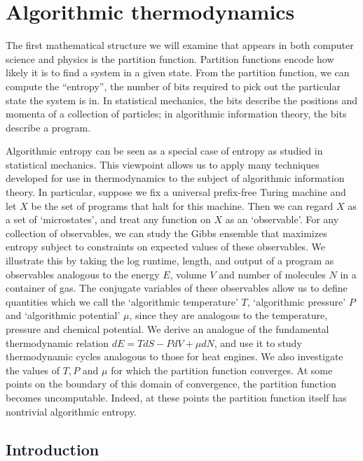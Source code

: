 \documentclass[12pt,twoside,openright]{report}
\begin{document}
\chapter{Algorithmic thermodynamics}

The first mathematical structure we will examine that appears in both computer science and physics is the partition function.  Partition functions encode how likely it is to find a system in a given state.  From the partition function, we can compute the ``entropy'', the number of bits required to pick out the particular state the system is in.  In statistical mechanics, the bits describe the positions and momenta of a collection of particles; in algorithmic information theory, the bits describe a program.

Algorithmic entropy can be seen as a special case of entropy as studied in statistical mechanics.  This viewpoint allows us to apply many techniques developed for use in thermodynamics to the subject of algorithmic information theory.  In particular, suppose we fix a universal prefix-free Turing machine and let $X$ be the set of programs that halt for this machine.  Then we can regard $X$ as a set of `microstates', and treat any function on $X$ as an `observable'.  For any collection of observables, we can study the Gibbs ensemble that maximizes entropy subject to constraints on expected values of these observables.  We illustrate this by taking the log runtime, length, and output of a program as observables analogous to the energy $E$, volume $V$ and number of molecules $N$ in a container of gas.  The conjugate variables of these observables allow us to define quantities which we call the `algorithmic temperature' $T$, `algorithmic pressure' $P$ and `algorithmic potential' $\mu$, since they are analogous to the temperature, pressure and chemical potential.  We derive an analogue of the fundamental thermodynamic relation $d E = TdS - P d V + \mu d N$, and use it to study thermodynamic cycles analogous to those for heat engines.  We also investigate the values of $T, P$ and $\mu$ for which the partition function converges. At some points on the boundary of this domain of convergence, the partition function becomes uncomputable.  Indeed, at these points the partition function itself has nontrivial algorithmic entropy.

\section{Introduction}\label{intro}
\end{document}
